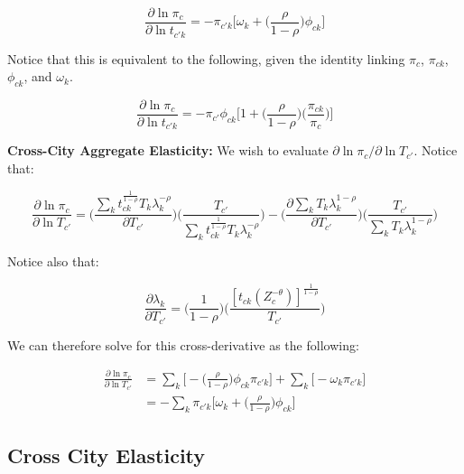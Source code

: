 \documentclass[10pt]{article}
\begin{document}
\begin{equation*}
    \frac{\partial\ln{\pi_{c}}}{\partial\ln{t_{{c'}k}}} = -{\pi_{{c'}k}}\Big[\omega_{k}+\Big(\frac{\rho}{1-\rho}\Big)\phi_{ck}]
\end{equation*}

Notice that this is equivalent to the following, given the identity linking $\pi_{c}$, $\pi_{ck}$, $\phi_{ck}$, and $\omega_{k}$.

\begin{equation}
    \frac{\partial\ln{\pi_{c}}}{\partial\ln{t_{{c'}k}}} = -{\pi_{c'}}{\phi_{ck}}\Big[1+\Big(\frac{\rho}{1-\rho}\Big)\Big(\frac{\pi_{ck}}{\pi_{c}}\Big)\Big]
\end{equation}

\noindent\textbf{Cross-City Aggregate Elasticity:} We wish to evaluate $\partial\ln{\pi_{c}}/\partial\ln{T_{c'}}$. Notice that:

\begin{equation*}
    \frac{\partial\ln{\pi_{c}}}{\partial\ln{T_{c'}}} = \Bigg(\frac{\sum\limits_{k}{{t^{\frac{1}{1-\rho}}_{ck}}}{T_{k}}{\lambda^{-\rho}_{k}}}{\partial{T_{c'}}}\Bigg)\Bigg(\frac{T_{c'}}{\sum\limits_{k}t^{\frac{1}{1-\rho}}_{ck}{T_{k}}{\lambda^{-\rho}_{k}}}\Bigg) - \Bigg(\frac{\partial\sum\limits_{k}{T_{k}}\lambda^{1-\rho}_{k}}{\partial{T_{c'}}}\Bigg)\Bigg(\frac{T_{c'}}{\sum\limits_{k}{T_{k}}{\lambda_{k}^{1-\rho}}}\Bigg)
\end{equation*}

Notice also that:

\begin{equation*}
    \frac{\partial\lambda_{k}}{\partial{T_{c'}}} = \Bigg(\frac{1}{1-\rho}\Bigg)\Bigg(\frac{[t_{ck}(Z_{c}^{-\theta})]^{\frac{1}{1-\rho}}}{T_{c'}}\Bigg)
\end{equation*}

We can therefore solve for this cross-derivative as the following:

\begin{align*}
    \frac{\partial\ln{\pi_{c}}}{\partial\ln{T_{c'}}} & = \sum\limits_{k}\Big[-\Big(\frac{\rho}{1-\rho}\Big)\phi_{ck}{\pi_{{c'}k}}\Big]+\sum\limits_{k}\Big[-\omega_{k}\pi_{{c'}k}\Big] \\ &= -\sum\limits_{k}{\pi_{{c'}k}}\Big[\omega_{k}+\Big(\frac{\rho}{1-\rho}\Big)\phi_{ck}\Big]
\end{align*}

\subsection{Cross City Elasticity}
\end{document}
